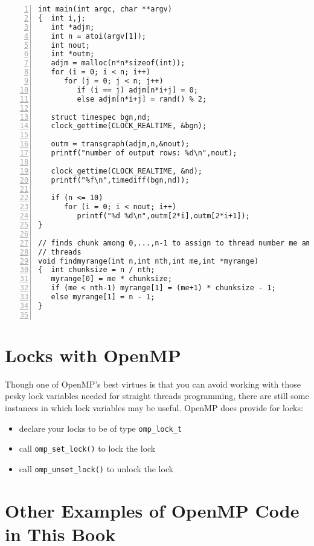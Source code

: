 \begin{lstlisting}[numbers=left]
int main(int argc, char **argv)
{  int i,j;
   int *adjm;
   int n = atoi(argv[1]);
   int nout;
   int *outm;
   adjm = malloc(n*n*sizeof(int));
   for (i = 0; i < n; i++)
      for (j = 0; j < n; j++)
         if (i == j) adjm[n*i+j] = 0;
         else adjm[n*i+j] = rand() % 2;

   struct timespec bgn,nd;
   clock_gettime(CLOCK_REALTIME, &bgn);

   outm = transgraph(adjm,n,&nout);
   printf("number of output rows: %d\n",nout);

   clock_gettime(CLOCK_REALTIME, &nd);
   printf("%f\n",timediff(bgn,nd));

   if (n <= 10)
      for (i = 0; i < nout; i++)
         printf("%d %d\n",outm[2*i],outm[2*i+1]);
}

// finds chunk among 0,...,n-1 to assign to thread number me among nth
// threads
void findmyrange(int n,int nth,int me,int *myrange)
{  int chunksize = n / nth;
   myrange[0] = me * chunksize;
   if (me < nth-1) myrange[1] = (me+1) * chunksize - 1;
   else myrange[1] = n - 1;
}


\end{lstlisting}

\section{Locks with OpenMP}

Though one of OpenMP's best virtues is that you can avoid working with
those pesky lock variables needed for straight threads programming,
there are still some instances in which lock variables may be useful.
OpenMP does provide for locks:

\begin{itemize}

\item declare your locks to be of type \lstinline{omp_lock_t}

\item call \lstinline{omp_set_lock()} to lock the lock

\item call \lstinline{omp_unset_lock()} to unlock the lock

\end{itemize}

\section{Other Examples of OpenMP Code in This Book}

